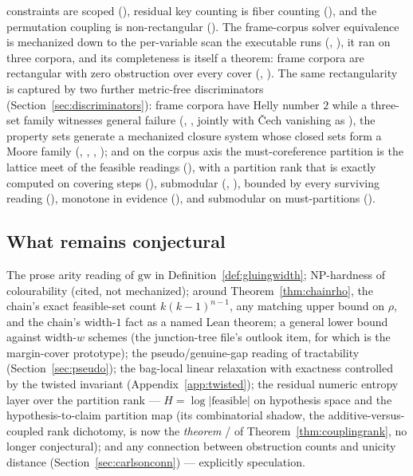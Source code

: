 \documentclass[11pt]{article}
\newcommand{\rectrho}{\rho}
\begin{document}
constraints are scoped (), residual
key counting is fiber counting (), and the
permutation coupling is non-rectangular
().  The frame-corpus solver equivalence is
mechanized down to the per-variable scan the executable runs
(,
), it ran on
three corpora, and its completeness is itself a theorem: frame
corpora are rectangular with zero obstruction over every cover
(,
).  The same rectangularity is
captured by two further metric-free discriminators
(Section~\ref{sec:discriminators}): frame corpora have Helly
number $2$ while a three-set family witnesses general failure
(, , jointly
with \v{C}ech vanishing as
), the property sets
generate a mechanized closure system whose closed sets form a Moore
family (, ,
, ); and on the corpus
axis the must-coreference partition is the lattice meet of the
feasible readings (), with a partition
rank that is exactly computed on covering steps
(), submodular
(, ), bounded
by every surviving reading
(), monotone in evidence
(), and submodular on must-partitions
().

\subsection{What remains conjectural}

The prose arity reading of $\mathrm{gw}$ in
Definition~\ref{def:gluingwidth}; NP-hardness of colourability
(cited, not mechanized); around Theorem~\ref{thm:chainrho}, the
chain's exact feasible-set count $k(k-1)^{n-1}$, any matching upper
bound on $\rectrho$, and the chain's width-$1$ fact as a named Lean
theorem; a general lower bound against width-$w$ schemes (the
junction-tree file's outlook item, for which
 is the margin-cover prototype);
the pseudo/genuine-gap reading of tractability
(Section~\ref{sec:pseudo}); the bag-local linear relaxation with
exactness controlled by the twisted invariant
(Appendix~\ref{app:twisted}); the residual numeric entropy layer
over the partition rank --- $H = \log \lvert\text{feasible}\rvert$
on hypothesis space and the hypothesis-to-claim partition map (its
combinatorial shadow, the additive-versus-coupled rank dichotomy,
is now the \emph{theorem}  /
 of Theorem~\ref{thm:couplingrank},
no longer conjectural); and any
connection between obstruction counts and unicity distance
(Section~\ref{sec:carlsonconn}) --- explicitly speculation.
\end{document}
